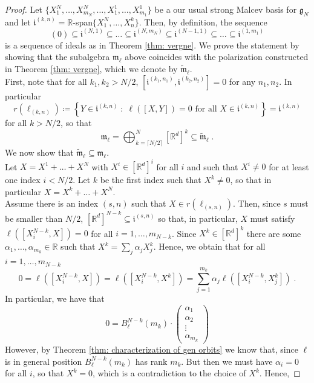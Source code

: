 \documentclass[pdflatex,sn-mathphys-num]{sn-jnl}
\theoremstyle{thmstyletwo}
\theoremstyle{thmstyleone}
\theoremstyle{thmstyletwo}
\newcommand{\fancyg}{\mathfrak{g}}
\newcommand{\fancym}{\mathfrak{m}}
\newcommand{\rdbracket}{[\mathbb{R}^d]}
\begin{document}
	\begin{proof}
		Let $\{X_1^N, \ldots, X_{m_N}^N, \ldots,X_1^1, \ldots, X_{m_1}^1\}$ be a our usual strong Malcev basis for $\fancyg_N$ and let $\mathfrak{i}^{(k,n)} = \mathbb{R}$-span$\{X_1^N, \ldots, X_n^k\}$. Then, by definition, the sequence 
		\[(0) \subseteq \mathfrak{i}^{(N,1)} \subseteq \ldots \subseteq \mathfrak{i}^{(N,m_N)} \subseteq \mathfrak{i}^{(N-1,1)} \subseteq \ldots \subseteq \mathfrak{i}^{(1,m_1)}\]
		is a sequence of ideals as in Theorem \ref{thm: vergne}.
		We prove the statement by showing that the subalgebra $\fancym_{\ell}$ above coincides with the polarization constructed in Theorem \ref{thm: vergne}, which we denote by $\tilde{\fancym}_{\ell}$.\\
		First, note that for all $k_1,k_2>N/2$,  $[\mathfrak{i}^{(k_1,n_1)},\mathfrak{i}^{(k_2,n_2)}] = 0$ for any $n_1,n_2$. In particular
		$$r(\ell_{(k,n)})\coloneqq \left\{Y \in \mathfrak{i}^{(k,n)} \; : \; \ell([X,Y]) = 0 \text{ for all } X \in \mathfrak{i}^{(k,n)}\right\}= \mathfrak{i}^{(k,n)}$$ 
		for all $k>N/2$, so that 
		$$\fancym_{\ell} = \bigoplus_{k=\lceil N/2 \rceil}^N [\mathbb{R}^d]^k \subseteq \tilde{\fancym}_{\ell} \;.$$
		We now show that $\tilde{\fancym}_{\ell} \subseteq \fancym_{\ell}$. \\
		Let $X = X^1+ \ldots +X^{N}$ with $X^i \in [\mathbb{R}^d]^i$ for all $i$ and such that $X^i \neq 0$ for at least one index $i <N/2$. Let $k$ be the first index such that $X^k \neq 0$, so that in particular $X = X^k+ \ldots +X^{N}$.\\ Assume there is an index $(s,n)$ such that $X \in r(\ell_{(s,n)})$. 
		Then, since $s$ must be smaller than $N/2$, $[\mathbb{R}^d]^{N-k} \subseteq \mathfrak{i}^{(s,n)}$ so that, in particular, $X$ must satisfy $\ell([X_i^{N-k},X]) = 0$ for all $i = 1, \ldots, m_{N-k}$. Since $X^k \in \rdbracket^k$ there are some $\alpha_1,\ldots, \alpha_{m_k} \in \mathbb{R}$ such that $X^k = \sum_{j} \alpha_jX_j^k$. Hence, we obtain that for all $i = 1, \ldots, m_{N-k}$
		\[0 = \ell([X_i^{N-k},X]) = \ell([X_i^{N-k},X^k]) =  \sum_{j=1}^{m_k}\alpha_j \ell([X_i^{N-k},X_j^k])\;.\]
		In particular, we have that 
		\[0 = B_{\ell}^{N-k}(m_k) \cdot
		\begin{pmatrix}
			\alpha_1 \\
			\alpha_2 \\
			\vdots \\
			\alpha_{m_k}
		\end{pmatrix}
		\]
		However, by Theorem \ref{thm: characterization of gen orbits} we know that, since $\ell$ is in general position $B_{\ell}^{N-k}(m_k)$ has rank $m_k$. But then we must have $\alpha_i = 0$ for all $i$, so that $X^k=0$, which is a contradiction to the choice of $X^k$. Hence,

\end{proof}
\end{document}
